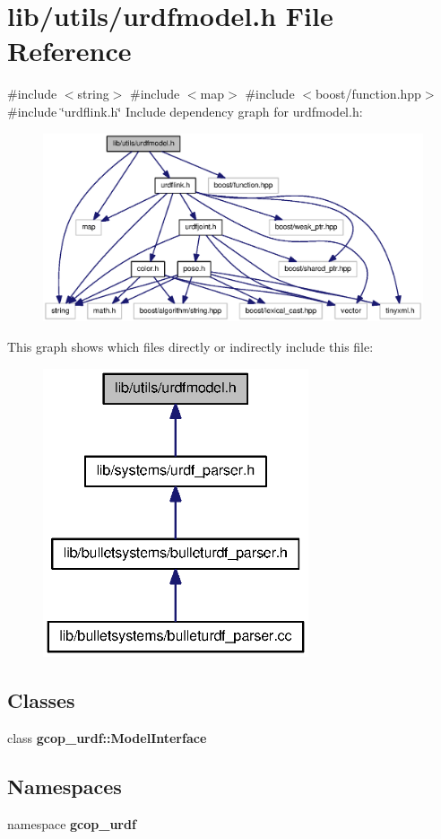 \section{lib/utils/urdfmodel.h \-File \-Reference}
\label{urdfmodel_8h}
{\ttfamily \#include $<$string$>$}\*
{\ttfamily \#include $<$map$>$}\*
{\ttfamily \#include $<$boost/function.\-hpp$>$}\*
{\ttfamily \#include \char`\"{}urdflink.\-h\char`\"{}}\*
\-Include dependency graph for urdfmodel.\-h\-:
\nopagebreak
\begin{figure}[H]
\begin{center}
\leavevmode
\includegraphics[width=350pt]{urdfmodel_8h__incl}
\end{center}
\end{figure}
\-This graph shows which files directly or indirectly include this file\-:
\nopagebreak
\begin{figure}[H]
\begin{center}
\leavevmode
\includegraphics[width=222pt]{urdfmodel_8h__dep__incl}
\end{center}
\end{figure}
\subsection*{\-Classes}
\begin{DoxyCompactItemize}
\item 
class {\bf gcop\-\_\-urdf\-::\-Model\-Interface}
\end{DoxyCompactItemize}
\subsection*{\-Namespaces}
\begin{DoxyCompactItemize}
\item 
namespace {\bf gcop\-\_\-urdf}
\end{DoxyCompactItemize}
